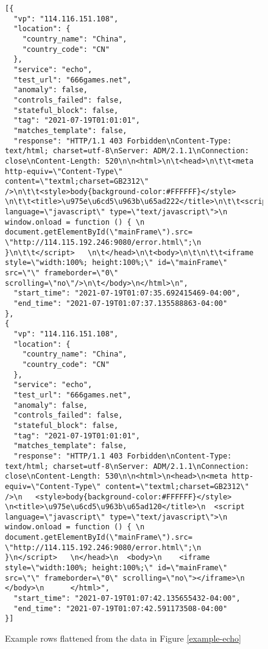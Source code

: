 \begin{figure}
\begin{verbatim}
[{
  "vp": "114.116.151.108",
  "location": {
    "country_name": "China",
    "country_code": "CN"
  },
  "service": "echo",
  "test_url": "666games.net",
  "anomaly": false,
  "controls_failed": false,
  "stateful_block": false,
  "tag": "2021-07-19T01:01:01",
  "matches_template": false,
  "response": "HTTP/1.1 403 Forbidden\nContent-Type: text/html; charset=utf-8\nServer: ADM/2.1.1\nConnection: close\nContent-Length: 520\n\n<html>\n\t<head>\n\t\t<meta http-equiv=\"Content-Type\" content=\"textml;charset=GB2312\" />\n\t\t<style>body{background-color:#FFFFFF}</style> \n\t\t<title>\u975e\u6cd5\u963b\u65ad222</title>\n\t\t<script language=\"javascript\" type=\"text/javascript\">\n         window.onload = function () { \n           document.getElementById(\"mainFrame\").src= \"http://114.115.192.246:9080/error.html\";\n            }\n\t\t</script>   \n\t</head>\n\t<body>\n\t\n\t\t<iframe style=\"width:100%; height:100%;\" id=\"mainFrame\" src=\"\" frameborder=\"0\" scrolling=\"no\"/>\n\t</body>\n</html>\n",
  "start_time": "2021-07-19T01:07:35.692415469-04:00",
  "end_time": "2021-07-19T01:07:37.135588863-04:00"
},
{
  "vp": "114.116.151.108",
  "location": {
    "country_name": "China",
    "country_code": "CN"
  },
  "service": "echo",
  "test_url": "666games.net",
  "anomaly": false,
  "controls_failed": false,
  "stateful_block": false,
  "tag": "2021-07-19T01:01:01",
  "matches_template": false,
  "response": "HTTP/1.1 403 Forbidden\nContent-Type: text/html; charset=utf-8\nServer: ADM/2.1.1\nConnection: close\nContent-Length: 530\n\n<html>\n<head>\n<meta http-equiv=\"Content-Type\" content=\"textml;charset=GB2312\" />\n   <style>body{background-color:#FFFFFF}</style> \n<title>\u975e\u6cd5\u963b\u65ad120</title>\n  <script language=\"javascript\" type=\"text/javascript\">\n         window.onload = function () { \n           document.getElementById(\"mainFrame\").src= \"http://114.115.192.246:9080/error.html\";\n            }\n</script>   \n</head>\n  <body>\n    <iframe style=\"width:100%; height:100%;\" id=\"mainFrame\" src=\"\" frameborder=\"0\" scrolling=\"no\"></iframe>\n    </body>\n      </html>",
  "start_time": "2021-07-19T01:07:42.135655432-04:00",
  "end_time": "2021-07-19T01:07:42.591173508-04:00"
}]
\end{verbatim}
\caption{Example rows flattened from the data in Figure \ref{example-echo}}
\label{example-flattened}
\end{figure}

